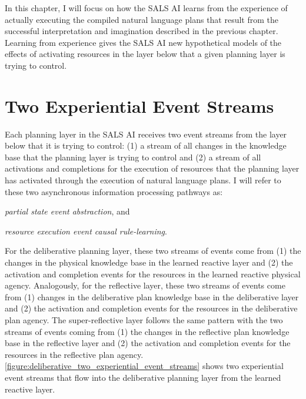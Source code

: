 In this chapter, I will focus on how the SALS AI learns from the
experience of actually executing the compiled natural language plans
that result from the successful interpretation and imagination
described in the previous chapter.  Learning from experience gives the
SALS AI new hypothetical models of the effects of activating resources
in the layer below that a given planning layer is trying to control.

\section{Two Experiential Event Streams}
\label{section:two_experiential_event_streams}

Each planning layer in the SALS AI receives two event streams from the
layer below that it is trying to control: (1) a stream of all changes
in the knowledge base that the planning layer is trying to control and
(2) a stream of all activations and completions for the execution of
resources that the planning layer has activated through the execution
of natural language plans.  I will refer to these two asynchronous
information processing pathways as:
\begin{packed_enumerate}
\item{{\emph{partial state event abstraction}}, and}
\item{{\emph{resource execution event causal rule-learning}}.}
\end{packed_enumerate}
For the deliberative planning layer, these two streams of events come
from (1) the changes in the physical knowledge base in the learned
reactive layer and (2) the activation and completion events for the
resources in the learned reactive physical agency.  Analogously, for
the reflective layer, these two streams of events come from (1)
changes in the deliberative plan knowledge base in the deliberative
layer and (2) the activation and completion events for the resources
in the deliberative plan agency.  The super-reflective layer follows
the same pattern with the two streams of events coming from (1) the
changes in the reflective plan knowledge base in the reflective layer
and (2) the activation and completion events for the resources in the
reflective plan agency.
{\mbox{\autoref{figure:deliberative_two_experiential_event_streams}}}
shows two experiential event streams that flow into the deliberative
planning layer from the learned reactive layer.
